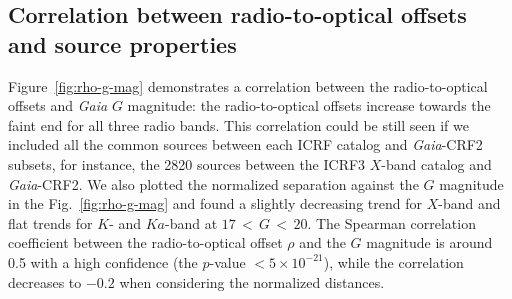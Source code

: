 \documentclass{aa}
\begin{document}

%

%
%




\subsection{Correlation between radio-to-optical offsets and source properties}    \label{subsec:r2o-corr}
%
    Figure~\ref{fig:rho-g-mag} demonstrates a correlation between the radio-to-optical offsets and \textit{Gaia} $G$ magnitude: the radio-to-optical offsets increase towards the faint end for all three radio bands.
    This correlation could be still seen if we included all the common sources between each ICRF catalog and \textit{Gaia}-CRF2 subsets, for instance, the 2820 sources between the ICRF3 $X$-band catalog and \textit{Gaia}-CRF2.
    We also plotted the normalized separation against the $G$ magnitude in the Fig.~\ref{fig:rho-g-mag} and found a slightly decreasing trend for $X$-band and flat trends for $K$- and $Ka$-band at $17\,<\,G\,<\,20$.
    The Spearman correlation coefficient between the radio-to-optical offset $\rho$ and the $G$ magnitude is around 0.5 with
    a high confidence (the $p$-value $<5 \times 10^{-21}$), while the correlation decreases to $-0.2$ when considering the normalized distances.
\end{document}
